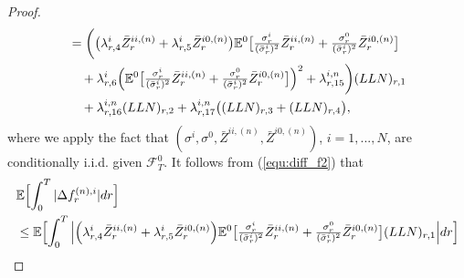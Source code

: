 \documentclass[10pt,a4paper]{article}
\newcommand{\MF}{{\mathcal{F}}}
\theoremstyle{plain}
\theoremstyle{definition}
\numberwithin{equation}{section}
\begin{document}
\begin{proof}
\begin{align}
&= \biggl(\bigl(\lambda_{r,4}^{i}\bar{Z}_{r}^{ii,(n)} + \lambda_{r,5}^{i}\bar{Z}_{r}^{i0,(n)}\bigr)\mathbb{E}^{0}\bigl[\tfrac{\sigma_{r}^{i}}{(\bar{\sigma}_{r}^{i})^{2}}\bar{Z}_{r}^{ii,(n)}+\tfrac{\sigma_{r}^{0}}{(\bar{\sigma}_{r}^{i})^{2}}\bar{Z}_{r}^{i0,(n)}\bigr] \nonumber \\ &\ \ \ +\lambda_{r,6}^{i}\Bigl(\mathbb{E}^{0}\bigl[\tfrac{\sigma_{r}^{i}}{(\bar{\sigma}_{r}^{i})^{2}}\bar{Z}_{r}^{ii,(n)}+\tfrac{\sigma_{r}^{0}}{(\bar{\sigma}_{r}^{i})^{2}}\bar{Z}_{r}^{i0,(n)}\bigr]\Bigr)^{2}+\lambda_{r,15}^{i,n}\biggr)(LLN)_{r,1} \nonumber \\
&\ \ \ + \lambda_{r,16}^{i,n}(LLN)_{r,2} + \lambda_{r,17}^{i,n}\bigl((LLN)_{r,3} + (LLN)_{r,4}\bigr) \label{equ:diff_f2},
\end{align}
where we apply the fact that $( \sigma^i, \sigma^0,  \bar{Z}^{ii, (n)}, \bar{Z}^{i0, (n)} )$, $i=1,...,N$, are conditionally i.i.d. given $\MF^0_T$.
It follows from (\ref{equ:diff_f2}) that
\begin{align}
&\mathbb{E}\Bigl[\int_{0}^{T}|\Delta f_{r}^{(n),i}|dr\Bigr] \nonumber \\
&\leq \mathbb{E}\Bigl[\int_{0}^{T}\Big|\Bigl(\lambda_{r,4}^{i}\bar{Z}_{r}^{ii,(n)} + \lambda_{r,5}^{i}\bar{Z}_{r}^{i0,(n)}\Bigr)\mathbb{E}^{0}\bigl[\tfrac{\sigma_{r}^{i}}{(\bar{\sigma}_{r}^{i})^{2}}\bar{Z}_{r}^{ii,(n)}+\tfrac{\sigma_{r}^{0}}{(\bar{\sigma}_{r}^{i})^{2}}\bar{Z}_{r}^{i0,(n)}\bigr](LLN)_{r,1}\Big|dr\Bigr] \nonumber \\

\end{align}
\end{proof}
\end{document}
